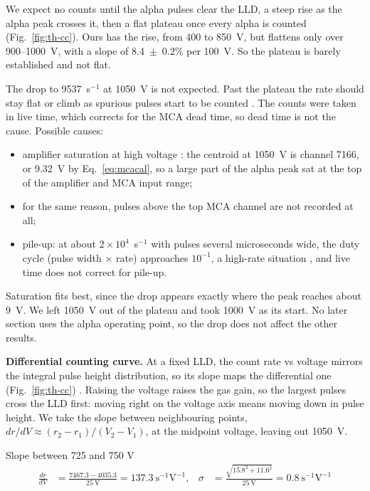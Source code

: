 \documentclass[12pt]{article}
\begin{document}
We expect no counts until the alpha pulses clear the LLD, a steep rise as the alpha peak crosses it, then a flat plateau once every alpha is counted (Fig.~\ref{fig:th-cc}). Ours has the rise, from 400 to 850~V, but flattens only over 900--1000~V, with a slope of 8.4~$\pm$~0.2\% per 100~V. So the plateau is barely established and not flat.

The drop to 9537~s$^{-1}$ at 1050~V is not expected. Past the plateau the rate should stay flat or climb as spurious pulses start to be counted \cite{knoll}. The counts were taken in live time, which corrects for the MCA dead time, so dead time is not the cause. Possible causes:
\begin{itemize}
\item amplifier saturation at high voltage \cite{labmanual}: the centroid at 1050~V is channel 7166, or 9.32~V by Eq.~\ref{eq:mcacal}, so a large part of the alpha peak sat at the top of the amplifier and MCA input range;
\item for the same reason, pulses above the top MCA channel are not recorded at all;
\item pile-up: at about $2\times10^4$~s$^{-1}$ with pulses several microseconds wide, the duty cycle (pulse width $\times$ rate) approaches $10^{-1}$, a high-rate situation \cite{knoll}, and live time does not correct for pile-up.
\end{itemize}
Saturation fits best, since the drop appears exactly where the peak reaches about 9~V. We left 1050~V out of the plateau and took 1000~V as its start. No later section uses the alpha operating point, so the drop does not affect the other results.

\textbf{Differential counting curve.} At a fixed LLD, the count rate vs voltage mirrors the integral pulse height distribution, so its slope maps the differential one (Fig.~\ref{fig:th-cc}) \cite{knoll}. Raising the voltage raises the gas gain, so the largest pulses cross the LLD first: moving right on the voltage axis means moving down in pulse height. We take the slope between neighbouring points, $dr/dV \approx (r_2 - r_1)/(V_2 - V_1)$, at the midpoint voltage, leaving out 1050~V.

\begin{samplecalc}{Slope between 725 and 750 V}
\begin{align*}
\frac{dr}{dV} &= \frac{7467.3 - 4035.3}{25\ \text{V}} = 137.3\ \text{s}^{-1}\text{V}^{-1}, &
\sigma &= \frac{\sqrt{15.8^2 + 11.6^2}}{25\ \text{V}} = 0.8\ \text{s}^{-1}\text{V}^{-1}
\end{align*}
\end{samplecalc}
\end{document}
